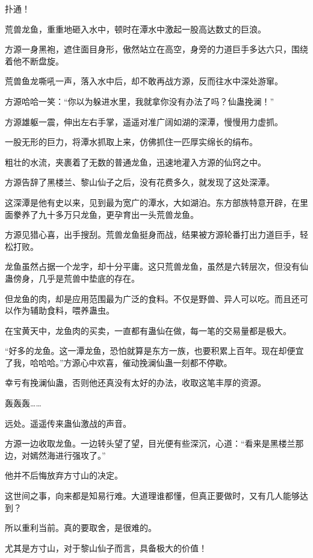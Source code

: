 
\begin{this_body}

扑通！

荒兽龙鱼，重重地砸入水中，顿时在潭水中激起一股高达数丈的巨浪。

方源一身黑袍，遮住面目身形，傲然站立在高空，身旁的力道巨手多达六只，围绕着他不断盘旋。

荒兽鱼龙嘶吼一声，落入水中后，却不敢再战方源，反而往水中深处游窜。

方源哈哈一笑：“你以为躲进水里，我就拿你没有办法了吗？仙蛊挽澜！”

方源雄躯一震，伸出左右手掌，遥遥对准广阔如湖的深潭，慢慢用力虚抓。

一股无形的巨力，将潭水抓取上来，仿佛抓住一匹厚实绵长的绢布。

粗壮的水流，夹裹着了无数的普通龙鱼，迅速地灌入方源的仙窍之中。

方源告辞了黑楼兰、黎山仙子之后，没有花费多久，就发现了这处深潭。

这深潭是他有史以来，见到最为宽广的潭水，大如湖泊。东方部族特意开辟，在里面豢养了九十多万只龙鱼，更孕育出一头荒兽龙鱼。

方源见猎心喜，出手搜刮。荒兽龙鱼挺身而战，结果被方源轮番打出力道巨手，轻松打败。

龙鱼虽然占据一个龙字，却十分平庸。这只荒兽龙鱼，虽然是六转层次，但没有仙蛊傍身，几乎是荒兽中垫底的存在。

但龙鱼的肉，却是应用范围最为广泛的食料。不仅是野兽、异人可以吃。而且还可以作为辅助食料，喂养蛊虫。

在宝黄天中，龙鱼肉的买卖，一直都有蛊仙在做，每一笔的交易量都是极大。

“好多的龙鱼。这一潭龙鱼，恐怕就算是东方一族，也要积累上百年。现在却便宜了我，哈哈哈。”方源心中欢喜，催动挽澜仙蛊一刻都不停歇。

幸亏有挽澜仙蛊，否则他还真没有太好的办法，收取这笔丰厚的资源。

轰轰轰……

远处。遥遥传来蛊仙激战的声音。

方源一边收取龙鱼。一边转头望了望，目光便有些深沉，心道：“看来是黑楼兰那边，对嫣然海进行强攻了。”

他并不后悔放弃方寸山的决定。

这世间之事，向来都是知易行难。大道理谁都懂，但真正要做时，又有几人能够达到？

所以重利当前。真的要取舍，是很难的。

尤其是方寸山，对于黎山仙子而言，具备极大的价值！


\end{this_body}
